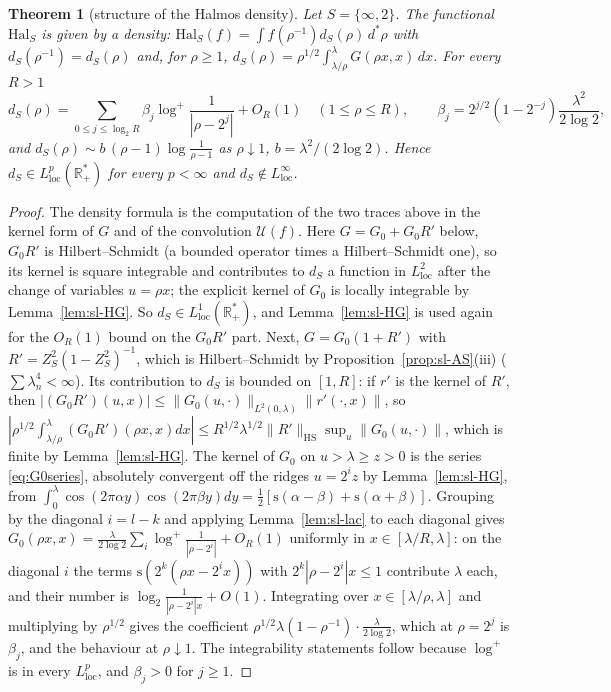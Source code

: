 \documentclass[11pt]{amsart}
\newtheorem{theorem}{Theorem}[section]
\theoremstyle{definition}
\theoremstyle{remark}
\newcommand{\R}{\mathbb R}
\begin{document}
\begin{theorem}[structure of the Halmos density]\label{thm:sl-L2}
Let $S=\{\infty,2\}$. The functional $\mathrm{Hal}_S$ is given by a density: $\mathrm{Hal}_S(f)=\int f(\rho^{-1})d_S(\rho)\,d^*\rho$ with
$d_S(\rho^{-1})=d_S(\rho)$ and, for $\rho\ge1$, $d_S(\rho)=\rho^{1/2}\int_{\lambda/\rho}^{\lambda}G(\rho x,x)\,dx$.
For every $R>1$
\[
d_S(\rho)=\sum_{0\le j\le\log_2R}\beta_j\log^+\frac1{|\rho-2^j|}+O_R(1)\quad(1\le\rho\le R),\qquad
\beta_j=2^{j/2}(1-2^{-j})\frac{\lambda^2}{2\log2},
\]
and $d_S(\rho)\sim b\,(\rho-1)\log\frac1{\rho-1}$ as $\rho\downarrow1$, $b=\lambda^2/(2\log2)$. Hence
$d_S\in L^p_{\mathrm{loc}}(\R_+^*)$ for every $p<\infty$ and $d_S\notin L^\infty_{\mathrm{loc}}$.
\end{theorem}
\begin{proof}
The density formula is the computation of the two traces above in the kernel form of $G$ and of the convolution
$\mathcal U(f)$. Here $G=G_0+G_0R'$ below, $G_0R'$ is Hilbert--Schmidt (a bounded operator times
a Hilbert--Schmidt one), so its kernel is square integrable and contributes to $d_S$ a function in
$L^2_{\mathrm{loc}}$ after the change of variables $u=\rho x$; the explicit kernel of $G_0$ is locally integrable by
Lemma~\ref{lem:sl-HG}. So $d_S\in L^1_{\mathrm{loc}}(\R_+^*)$, and
Lemma~\ref{lem:sl-HG} is used again for the $O_R(1)$ bound on the $G_0R'$ part. Next, $G=G_0(1+R')$ with $R'=Z_S^2(1-Z_S^2)^{-1}$, which is Hilbert--Schmidt by
Proposition~\ref{prop:sl-AS}(iii) ($\sum\lambda_n^4<\infty$). Its contribution to $d_S$ is bounded on $[1,R]$: if $r'$ is the
kernel of $R'$, then $|(G_0R')(u,x)|\le\|G_0(u,\cdot)\|_{L^2(0,\lambda)}\|r'(\cdot,x)\|$, so
$|\rho^{1/2}\int_{\lambda/\rho}^\lambda(G_0R')(\rho x,x)dx|\le R^{1/2}\lambda^{1/2}\|R'\|_{\mathrm{HS}}\sup_u\|G_0(u,\cdot)\|$, which is finite by
Lemma~\ref{lem:sl-HG}. The kernel of $G_0$ on $u>\lambda\ge z>0$ is the series \eqref{eq:G0series}, absolutely
convergent off the ridges $u=2^iz$ by Lemma~\ref{lem:sl-HG}, from $\int_0^\lambda\cos(2\pi\alpha y)\cos(2\pi\beta y)dy=\frac12[\mathrm s(\alpha-\beta)+\mathrm s(\alpha+\beta)]$.
Grouping by the diagonal $i=l-k$ and applying Lemma~\ref{lem:sl-lac} to each diagonal gives
$G_0(\rho x,x)=\frac{\lambda}{2\log2}\sum_i\log^+\frac1{|\rho-2^i|}+O_R(1)$ uniformly in $x\in[\lambda/R,\lambda]$: on the diagonal $i$ the
terms $\mathrm s(2^k(\rho x-2^ix))$ with $2^k|\rho-2^i|x\le1$ contribute $\lambda$ each, and their number is
$\log_2\frac1{|\rho-2^i|x}+O(1)$. Integrating over $x\in[\lambda/\rho,\lambda]$ and multiplying by $\rho^{1/2}$ gives the
coefficient $\rho^{1/2}\lambda(1-\rho^{-1})\cdot\frac{\lambda}{2\log2}$, which at $\rho=2^j$ is $\beta_j$, and the behaviour at
$\rho\downarrow1$. The integrability statements follow because $\log^+$ is in every $L^p_{\mathrm{loc}}$, and $\beta_j>0$ for
$j\ge1$.
\end{proof}
\end{document}
